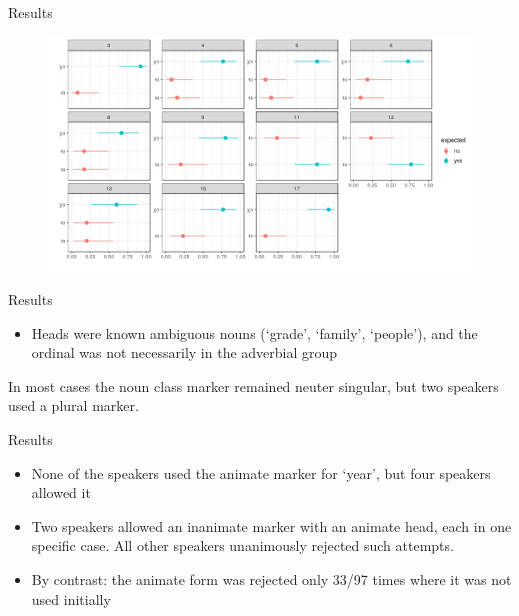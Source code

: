 \begin{frame}{Results}

\begin{figure}[h]
\centering
\includegraphics[scale=0.43]{images/ci.png}
\end{figure}
\end{frame}

\begin{frame}{Results}

\begin{itemize}
\item Heads were known ambiguous nouns (`grade', `family', `people'), and the ordinal was not necessarily in the adverbial group
\end{itemize}

\pause


\pause

In most cases the noun class marker remained neuter singular, but two speakers used a plural marker.

\pause


\end{frame}

\begin{frame}{Results}

\begin{itemize}
    \item None of the speakers used the animate marker for `year', but four speakers allowed it
    \item Two speakers allowed an inanimate marker with an animate head, each in one specific case. All other speakers unanimously rejected such attempts.
    \item By contrast: the animate form was rejected only 33/97 times where it was not used initially
\end{itemize}

\end{frame}

